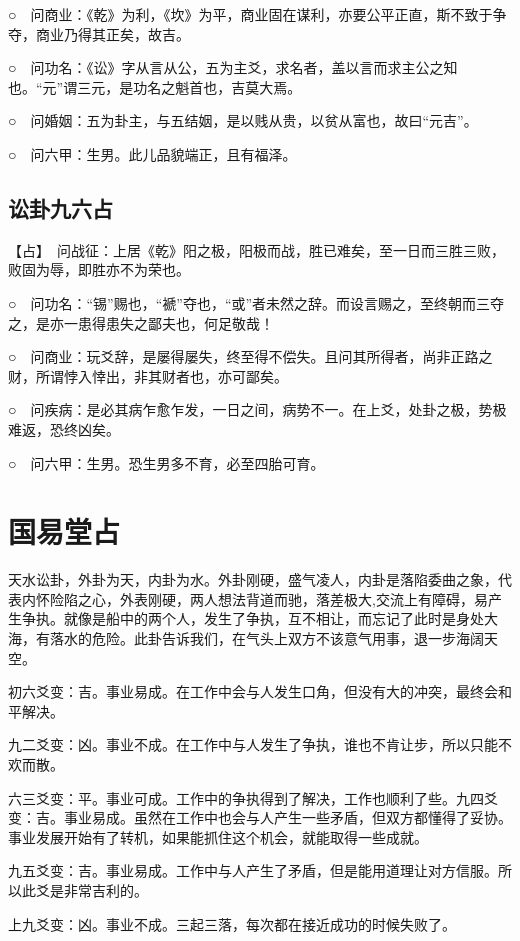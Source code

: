 \documentclass[12pt,oneside]{book}
\begin{document}
○　问商业：《乾》为利，《坎》为平，商业固在谋利，亦要公平正直，斯不致于争夺，商业乃得其正矣，故吉。

○　问功名：《讼》字从言从公，五为主爻，求名者，盖以言而求主公之知也。“元”谓三元，是功名之魁首也，吉莫大焉。

○　问婚姻：五为卦主，与五结姻，是以贱从贵，以贫从富也，故曰“元吉”。

○　问六甲：生男。此儿品貌端正，且有福泽。


\subsection{讼卦九六占}
【占】　问战征：上居《乾》阳之极，阳极而战，胜已难矣，至一日而三胜三败，败固为辱，即胜亦不为荣也。

○　问功名：“锡”赐也，“褫”夺也，“或”者未然之辞。而设言赐之，至终朝而三夺之，是亦一患得患失之鄙夫也，何足敬哉！

○　问商业：玩爻辞，是屡得屡失，终至得不偿失。且问其所得者，尚非正路之财，所谓悖入悻出，非其财者也，亦可鄙矣。

○　问疾病：是必其病乍愈乍发，一日之间，病势不一。在上爻，处卦之极，势极难返，恐终凶矣。

○　问六甲：生男。恐生男多不育，必至四胎可育。


\section{国易堂占}
天水讼卦，外卦为天，内卦为水。外卦刚硬，盛气凌人，内卦是落陷委曲之象，代表内怀险陷之心，外表刚硬，两人想法背道而驰，落差极大,交流上有障碍，易产生争执。就像是船中的两个人，发生了争执，互不相让，而忘记了此时是身处大海，有落水的危险。此卦告诉我们，在气头上双方不该意气用事，退一步海阔天空。

初六爻变：吉。事业易成。在工作中会与人发生口角，但没有大的冲突，最终会和平解决。

九二爻变：凶。事业不成。在工作中与人发生了争执，谁也不肯让步，所以只能不欢而散。

六三爻变：平。事业可成。工作中的争执得到了解决，工作也顺利了些。九四爻变：吉。事业易成。虽然在工作中也会与人产生一些矛盾，但双方都懂得了妥协。事业发展开始有了转机，如果能抓住这个机会，就能取得一些成就。

九五爻变：吉。事业易成。工作中与人产生了矛盾，但是能用道理让对方信服。所以此爻是非常吉利的。

上九爻变：凶。事业不成。三起三落，每次都在接近成功的时候失败了。
\end{document}
